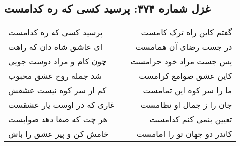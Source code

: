 \begin{center}
\section*{غزل شماره ۳۷۴: پرسید کسی که ره کدامست}
\label{sec:0374}
\begin{longtable}{l p{0.5cm} r}
پرسید کسی که ره کدامست
&&
گفتم کاین راه ترک کامست
\\
ای عاشق شاه دان که راهت
&&
در جست رضای آن همامست
\\
چون کام و مراد دوست جویی
&&
پس جست مراد خود حرامست
\\
شد جمله روح عشق محبوب
&&
کاین عشق صوامع کرامست
\\
کم از سر کوه نیست عشقش
&&
ما را سر کوه این تمامست
\\
غاری که در اوست یار عشقست
&&
جان را ز جمال او نظامست
\\
هر چت که صفا دهد صوابست
&&
تعیین بنمی کنم کدامست
\\
خامش کن و پیر عشق را باش
&&
کاندر دو جهان تو را امامست
\\
\end{longtable}
\end{center}
